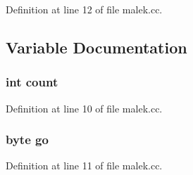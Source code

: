 Definition at line 12 of file malek.\+cc.



\subsection{Variable Documentation}
\subsubsection[{count}]{\setlength{\rightskip}{0pt plus 5cm}int count}\label{malek_8cc_ad43c3812e6d13e0518d9f8b8f463ffcf}


Definition at line 10 of file malek.\+cc.

\subsubsection[{go}]{\setlength{\rightskip}{0pt plus 5cm}byte go}\label{malek_8cc_add22ca059379c9a6a2addfe730305866}


Definition at line 11 of file malek.\+cc.

